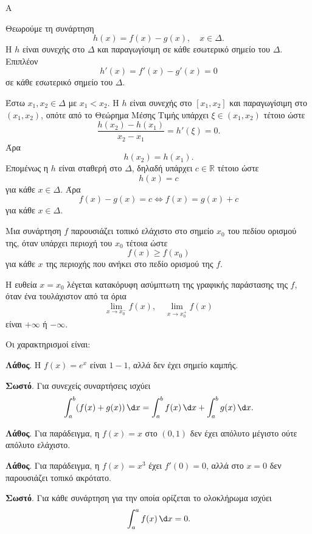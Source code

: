 \begin{thema}{Α}
\begin{erwthma}
\item Θεωρούμε τη συνάρτηση
\[
h(x)=f(x)-g(x),\quad x\in\varDelta.
\]
Η $h$ είναι συνεχής στο $\varDelta$ και παραγωγίσιμη σε κάθε εσωτερικό σημείο του $\varDelta$. Επιπλέον
\[
h'(x)=f'(x)-g'(x)=0
\]
σε κάθε εσωτερικό σημείο του $\varDelta$.

Έστω $x_1,x_2\in\varDelta$ με $x_1<x_2$. Η $h$ είναι συνεχής στο $[x_1,x_2]$ και παραγωγίσιμη στο $(x_1,x_2)$, οπότε από το Θεώρημα Μέσης Τιμής υπάρχει $\xi\in(x_1,x_2)$ τέτοιο ώστε
\[
\frac{h(x_2)-h(x_1)}{x_2-x_1}=h'(\xi)=0.
\]
Άρα
\[
h(x_2)=h(x_1).
\]
Επομένως η $h$ είναι σταθερή στο $\varDelta$, δηλαδή υπάρχει $c\in\mathbb{R}$ τέτοιο ώστε
\[
h(x)=c
\]
για κάθε $x\in\varDelta$. Άρα
\[
f(x)-g(x)=c
\Leftrightarrow
f(x)=g(x)+c
\]
για κάθε $x\in\varDelta$.

\item Μια συνάρτηση $f$ παρουσιάζει τοπικό ελάχιστο στο σημείο $x_0$ του πεδίου ορισμού της, όταν υπάρχει περιοχή του $x_0$ τέτοια ώστε
\[
f(x)\geq f(x_0)
\]
για κάθε $x$ της περιοχής που ανήκει στο πεδίο ορισμού της $f$.

\item Η ευθεία $x=x_0$ λέγεται κατακόρυφη ασύμπτωτη της γραφικής παράστασης της $f$, όταν ένα τουλάχιστον από τα όρια
\[
\lim_{x\to x_0^-}f(x),\quad
\lim_{x\to x_0^+}f(x)
\]
είναι $+\infty$ ή $-\infty$.

\item Οι χαρακτηρισμοί είναι:
\begin{alist}
\item \textbf{Λάθος}. Η $f(x)=e^x$ είναι $1-1$, αλλά δεν έχει σημείο καμπής.
\item \textbf{Σωστό}. Για συνεχείς συναρτήσεις ισχύει
\[
\dint_a^b(f(x)+g(x))\,\d x=\dint_a^b f(x)\,\d x+\dint_a^b g(x)\,\d x.
\]
\item \textbf{Λάθος}. Για παράδειγμα, η $f(x)=x$ στο $(0,1)$ δεν έχει απόλυτο μέγιστο ούτε απόλυτο ελάχιστο.
\item \textbf{Λάθος}. Για παράδειγμα, η $f(x)=x^3$ έχει $f'(0)=0$, αλλά στο $x=0$ δεν παρουσιάζει τοπικό ακρότατο.
\item \textbf{Σωστό}. Για κάθε συνάρτηση για την οποία ορίζεται το ολοκλήρωμα ισχύει
\[
\dint_a^a f(x)\,\d x=0.
\]
\end{alist}
\end{erwthma}
\end{thema}

